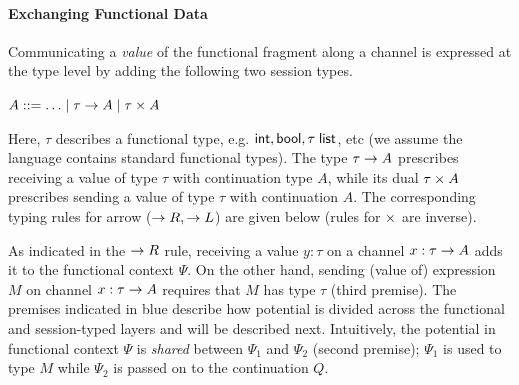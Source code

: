 \paragraph*{\textbf{Exchanging Functional Data}}
Communicating a \emph{value} of the functional fragment along a channel
is expressed at the type level by adding the following two session types.
\begin{center}
\begin{minipage}{0cm}
\begin{tabbing}
$A ::= \ldots \mid \tau \rightarrow A \mid \tau \times A$
\end{tabbing}
\end{minipage}
\end{center}
Here, $\tau$ describes a functional type, e.g. $\mathsf{int}, \mathsf{bool}, \tau \; \mathsf{list}$, etc
(we assume the language contains standard functional types).
The type $\tau \rightarrow A$ prescribes receiving a value of type $\tau$
with continuation type $A$, while its dual $\tau \times A$ prescribes
sending a value of type $\tau$ with continuation $A$. The corresponding
typing rules for arrow ($\rightarrow R, \rightarrow L$) are given
below (rules for $\times$ are inverse).
As indicated in the $\rightarrow R$ rule, receiving a value $y : \tau$ on a channel
$x : \tau \rightarrow A$ adds it to the functional context $\Psi$. On the
other hand, sending (value of) expression $M$ on channel $x : \tau \rightarrow A$
requires that $M$ has type $\tau$ (third premise).
The premises indicated in blue describe how potential is divided across
the functional and session-typed layers and will be described next.
Intuitively, the potential in functional context $\Psi$ is \emph{shared}
between $\Psi_1$ and $\Psi_2$ (second premise); $\Psi_1$ is used to type
$M$ while $\Psi_2$ is passed on to the continuation $Q$.

